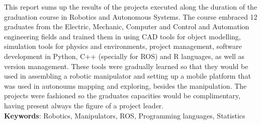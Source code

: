 \begin{thesisabastract}
This report sums up the results of the projects executed along the duration of the graduation course in Robotics and Autonomous Systems. The
course embraced 12 graduates from the Electric, Mechanic, Computer and Control and Automation engineering fields and trained them in using CAD tools for object modelling, simulation tools for physics and environments, project management, software development in Python, C++ (specially for ROS) and R languages, as well as version management. These tools were gradually learned so that they would be used in assembling a robotic manipulator and setting up a mobile platform that was used in autonoums mapping and exploring, besides the manipulation. The projects were fashioned so the graduates capacities would be complimentary, having present always the figure of a project leader.
\ \\


\textbf{Keywords}: Robotics, Manipulators, ROS, Programming languages, Statistics

\end{thesisabastract}
